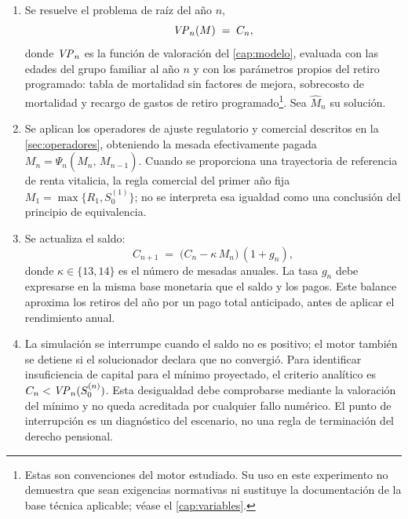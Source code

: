 \begin{enumerate}[leftmargin=*]
  \item Se resuelve el problema de raíz del año $n$,
        \begin{equation}
        \label{eq:rp-raiz}
          \mathit{VP}_n(M)\;=\;C_n ,
        \end{equation}
        donde $\mathit{VP}_n$ es la función de valoración del \cref{cap:modelo}, evaluada
        con las edades del grupo familiar al año $n$ y con los parámetros propios
        del retiro programado: tabla de mortalidad sin factores de mejora,
        sobrecosto de mortalidad y recargo de gastos de retiro programado\footnote{Estas son convenciones del motor estudiado. Su uso en este experimento no demuestra que sean exigencias normativas ni sustituye la documentación de la base técnica aplicable; véase el \cref{cap:variables}.}. Sea
        $\widehat M_n$ su solución.
  \item Se aplican los operadores de ajuste regulatorio y comercial descritos en la
        \cref{sec:operadores}, obteniendo la mesada efectivamente pagada
        $M_n=\Psi_n(\widehat M_n,\,M_{n-1})$. Cuando se proporciona una
        trayectoria de referencia de renta vitalicia, la regla comercial del
        primer año fija $M_1=\max\{R_1,S_0^{(1)}\}$; no se interpreta esa
        igualdad como una conclusión del principio de equivalencia.
  \item Se actualiza el saldo:
        \begin{equation}
        \label{eq:rp-saldo}
          C_{n+1}\;=\;\bigl(C_n-\kappa\,M_n\bigr)\,(1+g_n),
        \end{equation}
        donde $\kappa\in\{13,14\}$ es el número de mesadas anuales. La tasa
        $g_n$ debe expresarse en la misma base monetaria que el saldo y los
        pagos. Este balance aproxima los retiros del año por un pago total
        anticipado, antes de aplicar el rendimiento anual.
  \item La simulación se interrumpe cuando el saldo no es positivo;
        el motor también se detiene si el solucionador declara que no
        convergió. Para identificar insuficiencia de capital para el mínimo
        proyectado, el criterio analítico es
        $C_n<\mathit{VP}_n(S_0^{(n)})$. Esta desigualdad debe comprobarse mediante
        la valoración del mínimo y no queda acreditada por cualquier fallo
        numérico. El punto de interrupción es un diagnóstico del escenario,
        no una regla de terminación del derecho pensional.
\end{enumerate}

